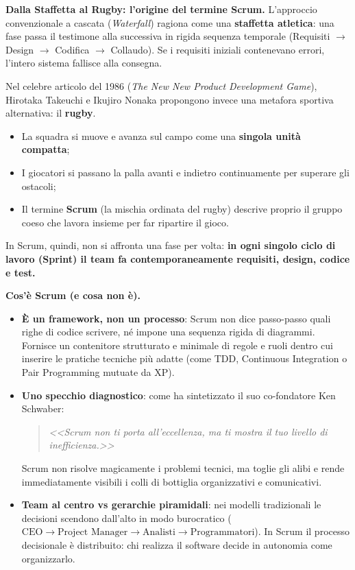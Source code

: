 \documentclass[12pt]{extarticle}
\begin{document}
\medskip
\noindent \textbf{Dalla Staffetta al Rugby: l'origine del termine Scrum.} L'approccio convenzionale a cascata (\textit{Waterfall}) ragiona come una \textbf{staffetta atletica}: una fase passa il testimone alla successiva in rigida sequenza temporale (Requisiti $\to$ Design $\to$ Codifica $\to$ Collaudo). Se i requisiti iniziali contenevano errori, l'intero sistema fallisce alla consegna.

Nel celebre articolo del 1986 (\textit{The New New Product Development Game}), Hirotaka Takeuchi e Ikujiro Nonaka propongono invece una metafora sportiva alternativa: il \textbf{rugby}.
\begin{itemize}
    \item La squadra si muove e avanza sul campo come una \textbf{singola unità compatta};
    \item I giocatori si passano la palla avanti e indietro continuamente per superare gli ostacoli;
    \item Il termine \textbf{Scrum} (la mischia ordinata del rugby) descrive proprio il gruppo coeso che lavora insieme per far ripartire il gioco.
\end{itemize}
In Scrum, quindi, non si affronta una fase per volta: \textbf{in ogni singolo ciclo di lavoro (Sprint) il team fa contemporaneamente requisiti, design, codice e test.}

\medskip
\noindent \textbf{Cos'è Scrum (e cosa non è).}
\begin{itemize}
    \item \textbf{È un framework, non un processo}: Scrum non dice passo-passo quali righe di codice scrivere, né impone una sequenza rigida di diagrammi. Fornisce un contenitore strutturato e minimale di regole e ruoli dentro cui inserire le pratiche tecniche più adatte (come TDD, Continuous Integration o Pair Programming mutuate da XP).
    \item \textbf{Uno specchio diagnostico}: come ha sintetizzato il suo co-fondatore Ken Schwaber:
    \begin{quote}
        \textit{<<Scrum non ti porta all'eccellenza, ma ti mostra il tuo livello di inefficienza.>>}
    \end{quote}
    Scrum non risolve magicamente i problemi tecnici, ma toglie gli alibi e rende immediatamente visibili i colli di bottiglia organizzativi e comunicativi.
    \item \textbf{Team al centro vs gerarchie piramidali}: nei modelli tradizionali le decisioni scendono dall'alto in modo burocratico ($\text{CEO} \to \text{Project Manager} \to \text{Analisti} \to \text{Programmatori}$). In Scrum il processo decisionale è distribuito: chi realizza il software decide in autonomia come organizzarlo.
\end{itemize}
\end{document}
